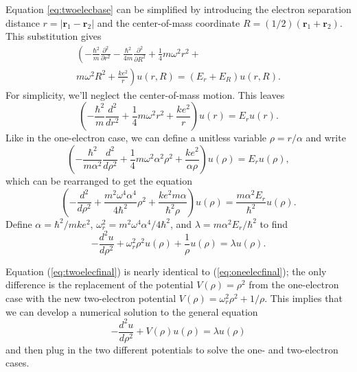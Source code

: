\documentclass[aps,prc,reprint]{revtex4-1}
\begin{document}
        Equation \ref{eq:twoelecbase} can be simplified by introducing the electron separation distance $r = |\mathbf{r}_1 - \mathbf{r}_2|$ and the center-of-mass coordinate $R = (1/2)(\mathbf{r}_1 + \mathbf{r}_2)$. This substitution gives
        \begin{multline*}
            \left( -\frac{\hbar^2}{m}\frac{\partial^2}{\partial r^2} - \frac{\hbar^2}{4m}\frac{\partial^2}{\partial R^2} + \frac{1}{4}m\omega^2 r^2 +{} \right.\\\left. m\omega^2 R^2  + \frac{ke^2}{r} \right) u(r,R) = (E_r + E_R) u(r,R).
        \end{multline*}
        For simplicity, we'll neglect the center-of-mass motion. This leaves
        \begin{equation*}
            \left( -\frac{\hbar^2}{m}\frac{d^2}{dr^2} + \frac{1}{4}m\omega^2 r^2 + \frac{ke^2}{r} \right) u(r) = E_r u(r).
        \end{equation*}
        Like in the one-electron case, we can define a unitless variable $\rho = r / \alpha$ and write
        \begin{equation*}
            \left( -\frac{\hbar^2}{m\alpha^2}\frac{d^2}{d\rho^2} + \frac{1}{4}m\omega^2\alpha^2 \rho^2 + \frac{ke^2}{\alpha\rho} \right) u(\rho) = E_r u(\rho),
        \end{equation*}
        which can be rearranged to get the equation
        \begin{equation*}
            \left( -\frac{d^2}{d\rho^2} + \frac{m^2\omega^4\alpha^4}{4\hbar^2} \rho^2 + \frac{ke^2m\alpha}{\hbar^2\rho} \right) u(\rho) = \frac{m\alpha^2E_r}{\hbar^2} u(\rho).
        \end{equation*}
        Define $\alpha = \hbar^2 / mke^2$, $\omega_r^2 = m^2\omega^4\alpha^4 / 4\hbar^2$, and $\lambda = m\alpha^2E_r / \hbar^2$ to find
        \begin{equation}
            -\frac{d^2 u}{d\rho^2} + \omega_r^2 \rho^2 u(\rho) + \frac{1}{\rho} u(\rho) = \lambda u(\rho). \label{eq:twoelecfinal}
        \end{equation}

        Equation (\ref{eq:twoelecfinal}) is nearly identical to (\ref{eq:oneelecfinal}); the only difference is the replacement of the potential $V(\rho) = \rho^2$ from the one-electron case with the new two-electron potential $V(\rho) = \omega_r^2 \rho^2 + 1/\rho$. This implies that we can develop a numerical solution to the general equation
        \begin{equation}
            -\frac{d^2 u}{d\rho^2} + V(\rho) u(\rho) = \lambda u(\rho)  \label{eq:generaldiffeq}
        \end{equation}
        and then plug in the two different potentials to solve the one- and two-electron cases.
\end{document}
